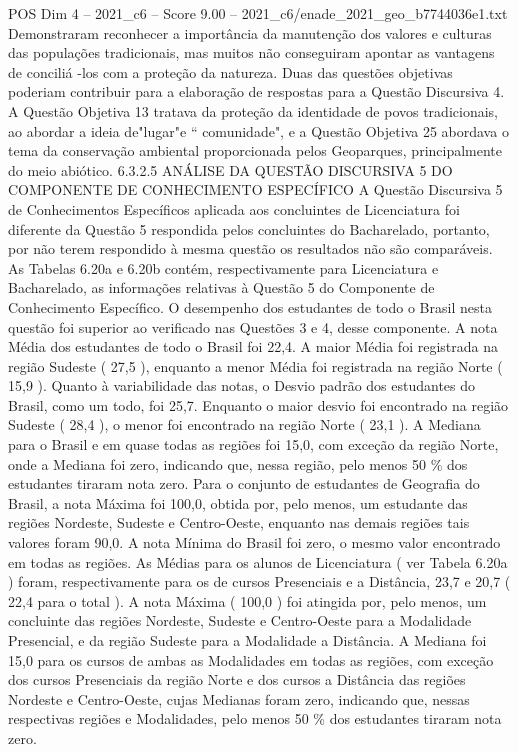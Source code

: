 \begin{textsample}{POS Dim 4 – 2021\_c6 – Score 9.00 – 2021\_c6/enade\_2021\_geo\_b7744036e1.txt}
Demonstraram reconhecer a importância da manutenção dos valores e culturas das populações tradicionais, mas muitos não conseguiram apontar as vantagens de conciliá -los com a proteção da natureza.
Duas das questões objetivas poderiam contribuir para a elaboração de respostas para a Questão Discursiva 4.
A Questão Objetiva 13 tratava da proteção da identidade de povos tradicionais, ao abordar a ideia de"lugar"e “ comunidade", e a Questão Objetiva 25 abordava o tema da conservação ambiental proporcionada pelos Geoparques, principalmente do meio abiótico. 6.3.2.5 ANÁLISE DA QUESTÃO DISCURSIVA 5 DO COMPONENTE DE CONHECIMENTO ESPECÍFICO A Questão Discursiva 5 de Conhecimentos Específicos aplicada aos concluintes de Licenciatura foi diferente da Questão 5 respondida pelos concluintes do Bacharelado, portanto, por não terem respondido à mesma questão os resultados não são comparáveis.
As Tabelas 6.20a e 6.20b contém, respectivamente para Licenciatura e Bacharelado, as informações relativas à Questão 5 do Componente de Conhecimento Específico.
O desempenho dos estudantes de todo o Brasil nesta questão foi superior ao verificado nas Questões 3 e 4, desse componente.
A nota Média dos estudantes de todo o Brasil foi 22,4.
A maior Média foi registrada na região Sudeste ( 27,5 ), enquanto a menor Média foi registrada na região Norte ( 15,9 ).
Quanto à variabilidade das notas, o Desvio padrão dos estudantes do Brasil, como um todo, foi 25,7.
Enquanto o maior desvio foi encontrado na região Sudeste ( 28,4 ), o menor foi encontrado na região Norte ( 23,1 ).
A Mediana para o Brasil e em quase todas as regiões foi 15,0, com exceção da região Norte, onde a Mediana foi zero, indicando que, nessa região, pelo menos 50 \% dos estudantes tiraram nota zero.
Para o conjunto de estudantes de Geografia do Brasil, a nota Máxima foi 100,0, obtida por, pelo menos, um estudante das regiões Nordeste, Sudeste e Centro-Oeste, enquanto nas demais regiões tais valores foram 90,0.
A nota Mínima do Brasil foi zero, o mesmo valor encontrado em todas as regiões.
As Médias para os alunos de Licenciatura ( ver Tabela 6.20a ) foram, respectivamente para os de cursos Presenciais e a Distância, 23,7 e 20,7 ( 22,4 para o total ).
A nota Máxima ( 100,0 ) foi atingida por, pelo menos, um concluinte das regiões Nordeste, Sudeste e Centro-Oeste para a Modalidade Presencial, e da região Sudeste para a Modalidade a Distância.
A Mediana foi 15,0 para os cursos de ambas as Modalidades em todas as regiões, com exceção dos cursos Presenciais da região Norte e dos cursos a Distância das regiões Nordeste e Centro-Oeste, cujas Medianas foram zero, indicando que, nessas respectivas regiões e Modalidades, pelo menos 50 \% dos estudantes tiraram nota zero.

\end{textsample}
